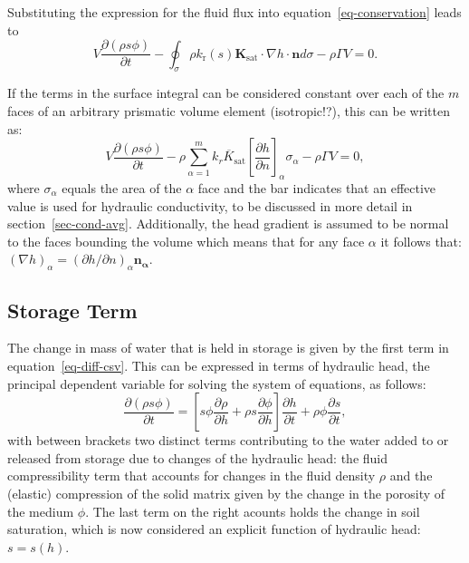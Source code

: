 \documentclass[fleqn]{article}
\begin{document}
Substituting the expression for the fluid flux into equation~\ref{eq-conservation}
leads to
\begin{equation}
  V \frac{\partial (\rho s \phi)}{\partial t} -
  \oint_\sigma \rho k_\text{r}(s) \mathbf{K}_{\textrm{sat}}
  \cdot \nabla h \cdot \mathbf{n} d\sigma -
  \rho \Gamma V = 0.
\end{equation}

If the terms in the surface integral can be considered constant over each of the 
$m$ faces of an arbitrary prismatic volume element (isotropic!?), 
this can be written as:
\begin{equation}
  V \frac{\partial (\rho s \phi)}{\partial t} -
  \rho \sum_{\alpha=1}^{m} \overline{k_r K_{\textrm{sat}}}
  \left[\frac{\partial h}{\partial n}\right]_\alpha \sigma_\alpha -
  \rho \Gamma V = 0,
  \label{eq-diff-csv}
\end{equation}
where $\sigma_\alpha$ equals the area of the $\alpha$ face and the bar indicates 
that an effective value is used for hydraulic conductivity, to be discussed 
in more detail in section~\ref{sec-cond-avg}. Additionally, the head 
gradient is assumed to be normal to the faces bounding the volume which
means that for any face $\alpha$ it follows that:
$(\nabla h)_\alpha = (\partial h/\partial n)_\alpha \mathbf{n_\alpha}$.

\subsection{Storage Term}
The change in mass of water that is held in storage is given by the first 
term in equation~\ref{eq-diff-csv}. This can be expressed in terms of hydraulic
head, the principal dependent variable for solving the system of equations,
as follows:
\begin{equation}
  \frac{\partial (\rho s \phi)}{\partial t} =
  \left[
    s \phi \frac{\partial \rho}{\partial h} +
    \rho s \frac{\partial \phi}{\partial h}
  \right]
  \frac{\partial h}{\partial t} +  
  \rho \phi \frac{\partial s}{\partial t},
  \label{eq-sto-terms}
\end{equation}
with between brackets two distinct terms contributing to the water
added to or released from storage due to changes of the hydraulic
head: the fluid compressibility term that accounts for changes in the
fluid density $\rho$ and the (elastic) compression of the solid matrix
given by the change in the porosity of the medium $\phi$. The last
term on the right acounts holds the change in soil saturation, which
is now considered an explicit function of hydraulic head: $s = s(h)$.
\end{document}
